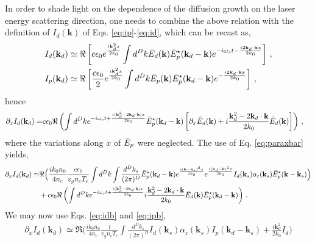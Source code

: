 \documentclass[
 reprint,
 amsmath,amssymb,
 aps,
]{revtex4-1}
\begin{document}
\begin{widetext}
In order to shade light on the dependence of the diffusion growth on the laser energy scattering direction, one needs to combine the above relation with the definition of $I_d(\mathbf{k})$ of  Eqs. \eqref{eq:ip}-\eqref{eq:id}, which can be recast as,
\begin{align}
I_d(\mathbf{k}_d) &\simeq  \Re\left[  c\epsilon_0e^{\frac{ i\mathbf{k}_d^2x}{2k_0}}  \int d^Dk \Bar{E}_d(\mathbf{k}) \Bar{E}_p^\star(\mathbf{k}_d-\mathbf{k})e^{-i\omega_s t -\frac{i2\mathbf{k}_d\cdot \mathbf{k}x}{2k_0}}\right]  \, , \label{eq:idb} \\
I_p(\mathbf{k}_d) &\simeq  \Re\left[  \frac{c\epsilon_0}{2}e^{\frac{ i\mathbf{k}_d^2x}{2k_0}}  \int d^Dk \Bar{E}_p(\mathbf{k}) \Bar{E}_p^\star(\mathbf{k}_d-\mathbf{k})e^{ -\frac{i2\mathbf{k}_d\cdot \mathbf{k}x}{2k_0}}\right]  \, , \label{eq:ipb}
\end{align}
hence
\begin{align}
\partial_xI_d(\mathbf{k}_d)=  &  c\epsilon_0  \Re\left( \int d^Dk e^{-i\omega_st+ \frac{i( \mathbf{k}_d^2-2\mathbf{k}_d\cdot \mathbf{k} )x}{2k_0}} \Bar{E}_p^\star(\mathbf{k}_d-\mathbf{k} )
\left[\partial_x \Bar{E}_d (\mathbf{k}  ) 
+i\frac{  \mathbf{k}_d^2-2\mathbf{k}_d\cdot \mathbf{k}}{2k_0} \Bar{E}_d(\mathbf{k})
\right]  \right)\, , \label{eq:idbdz}
\end{align}
where the variations along $x$ of $\Bar{E}_p$ were neglected. 
The  use of Eq. \eqref{eq:paraxbar} yields, 
\begin{align}
\partial_xI_d(\mathbf{k}_d)\simeq &\Re\Big( \frac{ik_0n_0}{4n_c} \frac{c\epsilon_0 }{  v_g n_c T_e}   \int d^Dk \int \frac{d^Dk_s}{(2\pi)^D} \Bar{E}_p^\star(\mathbf{k}_d-\mathbf{k})
e^{\frac{i(\mathbf{k}-\mathbf{k}_s)^2x}{2k_0} }
e^{\frac{i(\mathbf{k}_d-\mathbf{k})^2x}{2k_0} }
I_d(\mathbf{k}_s) \alpha_\mathrm{r}(\mathbf{k}_s) 
\Bar{E}_p^\star(\mathbf{k}-\mathbf{k}_s) 
 \Big) \nonumber\\
& +c\epsilon_0  \Re\left( \int d^Dk e^{-i\omega_s t+\frac{ i( \mathbf{k}_d^2-2\mathbf{k}_d\cdot \mathbf{k} )x}{2k_0}} 
i\frac{  \mathbf{k}_d^2-2\mathbf{k}_d\cdot \mathbf{k}}{2k_0} \Bar{E}_d(\mathbf{k})\Bar{E}_p^\star(\mathbf{k}_d-\mathbf{k} )
  \right)
\, . \label{eq:g1}
\end{align}
We may now use Eqs. \eqref{eq:idb} and  \eqref{eq:ipb}, 
\begin{align}
\partial_xI_d(\mathbf{k}_d)\simeq \Re\Big( \frac{ik_0n_0}{4n_c} \frac{1 }{  v_g n_c T_e}    \int \frac{d^Dk_s}{(2\pi)^D} I_d(\mathbf{k}_s) \alpha_\mathrm{r}(\mathbf{k}_s)
I_p(\mathbf{k}_d-\mathbf{k}_s)
+\frac{i\mathbf{k}_d^2}{2k_0} I_d \Big) 

\end{align}
\end{widetext}
\end{document}
